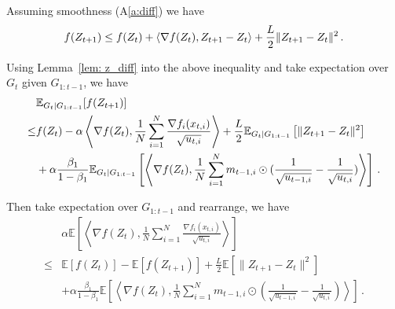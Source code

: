 \documentclass[11pt]{article}
\begin{document}
Assuming smoothness (A\ref{a:diff}) we have 
\begin{align}\notag
f( Z_{t+1}) \leq f( Z_{t}) + \langle \nabla f( Z_{t}),  Z_{t+1}-  Z_{t} \rangle + \frac{L}{2}\| Z_{t+1}-  Z_{t}\|^2 \, .
\end{align}

Using Lemma~\ref{lem: z_diff} into the above inequality and take expectation over $G_{t}$ given $G_{1:t-1}$, we have 
\begin{align}\notag
\begin{split}
&\mathbb E_{G_t|G_{1:t-1}} [f( Z_{t+1})]\\
\leq & f( Z_{t})  - \alpha  \left \langle \nabla f( Z_{t}), \frac{1}{N} \sum_{i=1}^N \frac{\nabla f_i(x_{t,i})}{\sqrt{u_{t,i}}}  \right \rangle + \frac{L}{2} \mathbb E_{G_t|G_{1:t-1}}\left[\| Z_{t+1}-  Z_{t}\|^2 \right]   \\
&+ \alpha \frac{\beta_1}{1-\beta_1}  \mathbb E_{G_t|G_{1:t-1}} \left [\left \langle \nabla f( Z_{t}) , \frac{1}{N} \sum_{i=1}^N m_{t-1	,i} \odot (\frac{1}{\sqrt{u_{t-1,i}}} - \frac{1}{\sqrt{u_{t,i}}}) \right \rangle \right] \, .
\end{split}
\end{align}

Then take expectation over $G_{1:t-1}$ and rearrange, we have 
\begin{align}\label{eq: exp_lip}
& \alpha  \mathbb E\left[\left \langle \nabla f( Z_{t}), \frac{1}{N} \sum_{i=1}^N \frac{\nabla f_i(x_{t,i})}{\sqrt{u_{t,i}}}  \right \rangle \right]\\
\leq & \mathbb E  [f( Z_{t})]  -  \mathbb E [f( Z_{t+1})] + \frac{L}{2} \mathbb E\left[\| Z_{t+1}-  Z_{t}\|^2 \right] \nonumber  \\
&+ \alpha \frac{\beta_1}{1-\beta_1}  \mathbb E \left [\left \langle \nabla f( Z_{t}) , \frac{1}{N} \sum_{i=1}^N m_{t-1	,i} \odot (\frac{1}{\sqrt{u_{t-1,i}}} - \frac{1}{\sqrt{u_{t,i}}}) \right \rangle \right] \, .
\end{align}
\end{document}
